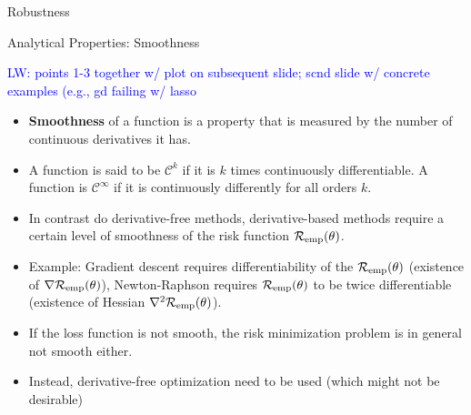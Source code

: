 \begin{vbframe}{Robustness}
% 
% 

\end{vbframe}


\begin{vbframe}{Analytical Properties: Smoothness}

\textcolor{blue}{LW: points 1-3 together w/ plot on subsequent slide; scnd slide w/ concrete examples (e.g., gd failing w/ lasso}

\begin{itemize}
    \item \textbf{Smoothness} of a function is a property that is measured by the number of continuous derivatives it has. 
    \item A function is said to be $\mathcal{C}^k$ if it is $k$ times continuously differentiable. A function is $\mathcal{C}^\infty$ if it is continuously differently for all orders $k$. 
    \item In contrast do derivative-free methods, derivative-based methods require a certain level of smoothness of the risk function $\mathcal{R}_{\text{emp}}(\theta)$. 
    \item Example: Gradient descent requires differentiability of the $\mathcal{R}_{\text{emp}}(\theta)$ (existence of $\nabla \mathcal{R}_{\text{emp}}(\theta)$), Newton-Raphson requires $\mathcal{R}_{\text{emp}}(\theta)$ to be twice differentiable (existence of Hessian $\nabla^2 \mathcal{R}_{\text{emp}}(\theta)$). 

    \framebreak 

    \item If the loss function is not smooth, the risk minimization problem is in general not smooth either. 
    \item  Instead, derivative-free optimization need to be used (which might not be desirable)
\end{itemize}


\end{vbframe}
